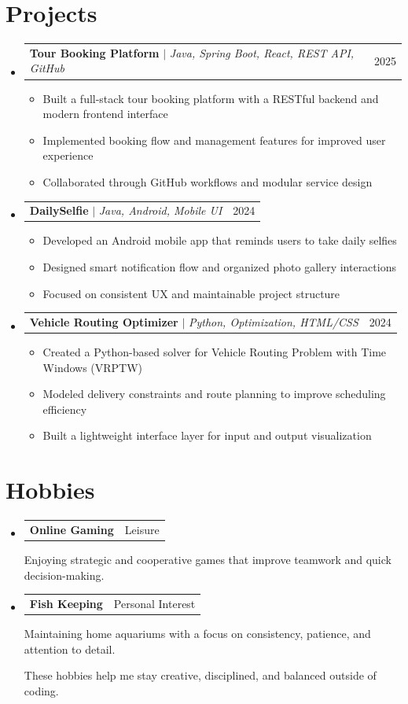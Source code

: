 \documentclass[letterpaper,11pt]{article}
\makeatletter
\newcommand{\resumeItem}[1]{
  \item\small{
    {#1 \vspace{-2pt}}
  }
}
\newcommand{\resumeProjectHeading}[2]{
    \item
    \begin{tabular*}{0.97\textwidth}{l@{\extracolsep{\fill}}r}
      \small#1 & #2 \\
    \end{tabular*}\vspace{-7pt}
}
\newcommand{\resumeSubHeadingListStart}{\begin{itemize}[leftmargin=0.15in, label={}]}
\newcommand{\resumeSubHeadingListEnd}{\end{itemize}}
\newcommand{\resumeItemListStart}{\begin{itemize}}
\newcommand{\resumeItemListEnd}{\end{itemize}\vspace{-5pt}}
\makeatother
\begin{document}
\section{Projects}
    \resumeSubHeadingListStart

        \resumeProjectHeading
        {\textbf{Tour Booking Platform} $|$ \footnotesize\emph{Java, Spring Boot, React, REST API, GitHub}}{2025}
        \resumeItemListStart
            \resumeItem{Built a full-stack tour booking platform with a RESTful backend and modern frontend interface}
            \resumeItem{Implemented booking flow and management features for improved user experience}
            \resumeItem{Collaborated through GitHub workflows and modular service design}
          \resumeItemListEnd
    
        \resumeProjectHeading
        {\textbf{DailySelfie} $|$ \footnotesize\emph{Java, Android, Mobile UI}}{2024}
        \resumeItemListStart
            \resumeItem{Developed an Android mobile app that reminds users to take daily selfies}
            \resumeItem{Designed smart notification flow and organized photo gallery interactions}
            \resumeItem{Focused on consistent UX and maintainable project structure}
          \resumeItemListEnd
          
      \resumeProjectHeading
        {\textbf{Vehicle Routing Optimizer} $|$ \footnotesize\emph{Python, Optimization, HTML/CSS}}{2024}
        \resumeItemListStart
            \resumeItem{Created a Python-based solver for Vehicle Routing Problem with Time Windows (VRPTW)}
            \resumeItem{Modeled delivery constraints and route planning to improve scheduling efficiency}
            \resumeItem{Built a lightweight interface layer for input and output visualization}
        \resumeItemListEnd
          
    \resumeSubHeadingListEnd

\section{Hobbies}
  \resumeSubHeadingListStart

          \resumeProjectHeading
          {\textbf{Online Gaming}\vspace{8pt}}{Leisure}
          {\small{Enjoying strategic and cooperative games that improve teamwork and quick decision-making.}}

          \resumeProjectHeading
          {\textbf{Fish Keeping}\vspace{8pt}}{Personal Interest}
          {\small{Maintaining home aquariums with a focus on consistency, patience, and attention to detail.}}

          \vspace{3pt}
          {\small{These hobbies help me stay creative, disciplined, and balanced outside of coding.}}
          
    \resumeSubHeadingListEnd 
\end{document}
